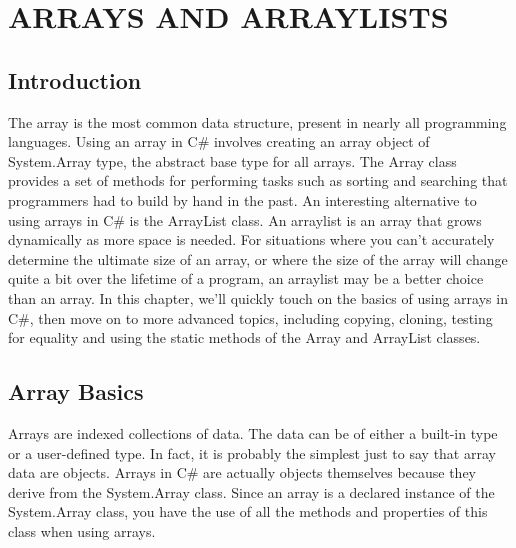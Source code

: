 \documentclass[12pt,a4paper,final,twoside,titlepage]{book}
\begin{document}
\chapter{ARRAYS AND ARRAYLISTS}
\section{Introduction}
The array is the most common data structure, present in nearly all programming languages. Using an array in C\# involves creating an array object of System.Array type, the abstract base type for all arrays. The Array class provides a set of methods for performing tasks such as sorting and searching that programmers had to build by hand in the past.
An interesting alternative to using arrays in C\# is the ArrayList class. An arraylist is an array that grows dynamically as more space is needed. For situations where you can’t accurately determine the ultimate size of an array, or where the size of the array will change quite a bit over the lifetime of a program, an arraylist may be a better choice than an array.
In this chapter, we’ll quickly touch on the basics of using arrays in C\#, then move on to more advanced topics, including copying, cloning, testing for equality and using the static methods of the Array and ArrayList classes.

\section{Array Basics}
Arrays are indexed collections of data. The data can be of either a built-in type or a user-defined type. In fact, it is probably the simplest just to say that array data are objects. Arrays in C\# are actually objects themselves because they derive from the System.Array class. Since an array is a declared instance of the System.Array class, you have the use of all the methods and properties of this class when using arrays.
\end{document}
